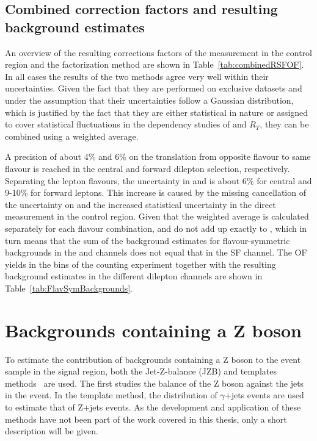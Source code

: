 \subsection{Combined correction factors and resulting background estimates}
An overview of the resulting corrections factors of the measurement in the control region and the factorization method are shown in Table~\ref{tab:combinedRSFOF}. In all cases the results of the two methods agree very well within their uncertainties. Given the fact that they are performed on exclusive datasets and under the assumption that their uncertainties follow a Gaussian distribution, which is justified by the fact that they are either statistical in nature or assigned to cover statistical fluctuations in the dependency studies of \rmue and $R_T$, they can be combined using a weighted average. 
 
A precision of about 4\% and 6\% on the translation from opposite flavour to same flavour is reached in the central and forward dilepton selection, respectively. Separating the lepton flavours, the uncertainty in \Reeof and \Rmmof is about 6\% for central and 9-10\% for forward leptons. This increase is caused by the missing cancellation of the uncertainty on \rmue and the increased statistical uncertainty in the direct measurement in the control region. Given that the weighted average is calculated separately for each flavour combination, \Reeof and \Rmmof do not add up exactly to \Rsfof, which in turn means that the sum of the background estimates for flavour-symmetric backgrounds in the \EE and \MM channels does not equal that in the SF channel. The OF yields in the \mll bins of the counting experiment together with the resulting background estimates in the different dilepton channels are shown in Table~\ref{tab:FlavSymBackgrounds}. 

\section{Backgrounds containing a Z boson}
To estimate the contribution of backgrounds containing a Z boson to the event sample in the signal region, both the Jet-Z-balance (JZB) and \MET templates methods~\cite{Chatrchyan:2012qka} are used. The first studies the balance of the Z boson against the jets in the event. In the \MET template method, the \MET distribution of $\gamma$+jets events are used to estimate that of Z+jets events. As the development and application of these methods have not been part of the work covered in this thesis, only a short description will be given.
